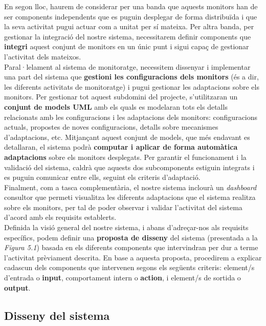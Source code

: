 En segon lloc, haurem de considerar per una banda que aquests monitors han de ser components independents que es puguin desplegar de forma distribuïda i que la seva activitat pugui actuar com a unitat per sí mateixa. Per altra banda, per gestionar la integració del nostre sistema, necessitarem definir components que \textbf{integri} aquest conjunt de monitors en un únic punt i sigui capaç de gestionar l'activitat dels mateixos.\\

Paral·lelament al sistema de monitoratge, necessitem dissenyar i implementar una part del sistema que \textbf{gestioni les configuracions dels monitors} (és a dir, les diferents activitats de monitoratge) i pugui gestionar les adaptacions sobre els monitors. Per gestionar tot aquest subdomini del projecte, s'utilitzaran un \textbf{conjunt de models UML} amb els quals es modelaran tots els detalls relacionats amb les configuracions i les adaptacions dels monitors: configuracions actuals, propostes de noves configuracions, detalls sobre mecanismes d'adaptacions, etc. Mitjançant aquest conjunt de models, que més endavant es detallaran, el sistema podrà \textbf{computar i aplicar de forma automàtica adaptacions} sobre els monitors desplegats. Per garantir el funcionament i la validació del sistema, caldrà que aquests dos subcomponents estiguin integrats i es puguin comunicar entre ells, seguint els criteris d'adaptació.\\

Finalment, com a tasca complementària, el nostre sistema inclourà un \textit{dashboard} consultor que permeti visualitza les diferents adaptacions que el sistema realitza sobre els monitors, per tal de poder observar i validar l'activitat del sistema d'acord amb els requisits establerts.\\

Definida la visió general del nostre sistema, i abans d'adreçar-nos als requisits específics, podem definir una \textbf{proposta de disseny} del sistema (presentada a la \textit{Figura 5.1}) basada en els diferents components que intervindran per dur a terme l'activitat prèviament descrita. En base a aquesta proposta, procedirem a explicar cadascun dels components que intervenen segons els següents criteris: element/s d'entrada o \textbf{input}, comportament intern o \textbf{action}, i element/s de sortida o \textbf{output}.\\

\subsection{Disseny del sistema}


